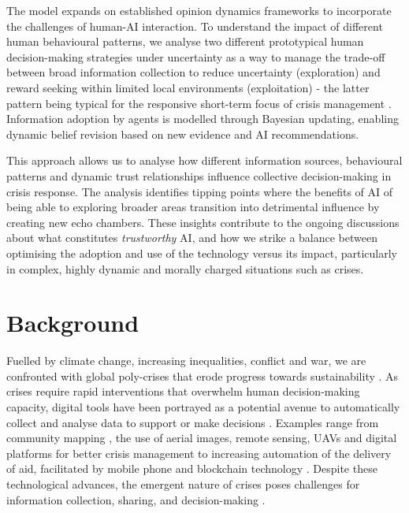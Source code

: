 \documentclass[pdflatex,sn-apa]{sn-jnl}%
\begin{document}
The model expands on established opinion dynamics frameworks \citep{geschke2019triple} to incorporate the challenges of human-AI interaction. To understand the impact of different human behavioural patterns, we analyse two different prototypical human decision-making strategies under uncertainty as a way to manage the trade-off between broad information collection to reduce uncertainty (exploration) and reward seeking within limited local environments (exploitation) - the latter pattern being typical for the responsive short-term focus of crisis management \citep{comes2020coordination}. Information adoption by agents is modelled through Bayesian updating, enabling dynamic belief revision based on new evidence and AI recommendations.

This approach allows us to analyse how different information sources, behavioural patterns and dynamic trust relationships influence collective decision-making in crisis response. The analysis identifies tipping points where the benefits of AI of being able to exploring broader areas transition into detrimental influence by creating new echo chambers. These insights contribute to the ongoing discussions about what constitutes \textit{trustworthy} AI, and how we strike a balance between optimising the adoption and use of the technology versus its impact, particularly in complex, highly dynamic and morally charged situations such as crises.

\section{Background}

Fuelled by climate change, increasing inequalities, conflict and war, we are confronted with global poly-crises that erode progress towards sustainability \citep{sogaard2024evolution}. As crises require rapid interventions that overwhelm human decision-making capacity, digital tools have been portrayed as a potential avenue to automatically collect and analyse data to support or make decisions \citep{qadir2016crisis}. Examples range from community mapping \citep{champlin2023measuring, soden2014crowdsourced}, the use of aerial images, remote sensing, UAVs and digital platforms for better crisis management \citep{voigt2007satellite} to increasing automation of the delivery of aid, facilitated by mobile phone and blockchain technology \citep{coughlan2015forecast, baharmand2019leveraging}. Despite these technological advances, the emergent nature of crises poses challenges for information collection, sharing, and decision-making \citep{turoff2004design, nespeca2020towards}.
\end{document}
